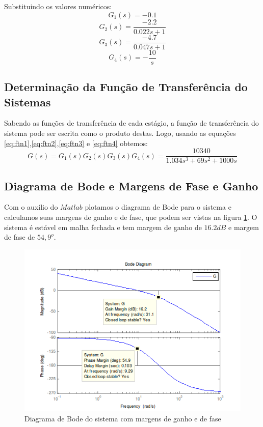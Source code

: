 \documentclass{article}
\begin{document}
Substituindo os valores numéricos:
\begin{equation}
\label{eq:ftn1}
G_1(s) = -0.1
\end{equation}
\begin{equation}
\label{eq:ftn2}
G_2(s) = \frac{-2.2}{0.022s + 1}
\end{equation}
\begin{equation}
\label{eq:ftn3}
G_3(s) = \frac{-4.7}{0.047s + 1}
\end{equation}
\begin{equation}
\label{eq:ftn4}
G_4(s) = -\frac{10}{s}
\end{equation}
\subsection{Determinação da Função de Transferência do Sistemas}
Sabendo as funções de transferência de cada estágio, a função de transferência do sistema pode ser escrita como o produto destas. Logo, usando as equações \ref{eq:ftn1},\ref{eq:ftn2},\ref{eq:ftn3} e \ref{eq:ftn4} obtemos:
\begin{equation}
\label{eq:ftsistema}
G(s) = G_1(s)G_2(s)G_3(s)G_4(s) = \frac{10340}{1.034s^3 + 69s^2 + 1000s}
\end{equation}

\subsection{Diagrama de Bode e Margens de Fase e Ganho}
Com o auxílio do $Matlab$ plotamos o diagrama de Bode para o sistema e calculamos suas margens de ganho e de fase, que podem ser vistas na figura \ref{fig:bode}. O sistema é estável em malha fechada e tem margem de ganho de $16.2dB$ e margem de fase de $54,9^o$.
\begin{figure}[H]
\centering
\includegraphics[width=0.8\linewidth]{bode}
\caption{Diagrama de Bode do sistema com margens de ganho e de fase}
\label{fig:bode}
\end{figure}
\end{document}
